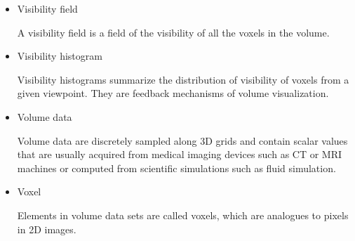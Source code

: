 \documentclass[a4paper, 12pt, twoside, openright]{report}         %
\begin{document}
\begin{itemize}
\item Visibility field

A visibility field is a field of the visibility of all the voxels in the volume.

\item Visibility histogram

Visibility histograms summarize the distribution of visibility of voxels from a given viewpoint. They are feedback mechanisms of volume visualization.

\item Volume data

Volume data are discretely sampled along 3D grids and contain scalar values that are usually acquired from medical imaging devices such as CT or MRI machines or computed from scientific simulations such as fluid simulation.

\item Voxel

Elements in volume data sets are called voxels, which are analogues to pixels in 2D images.

\end{itemize}

\cleardoublepage

                                
                                





%

\begin{appendix}



\end{appendix}






\end{document}
